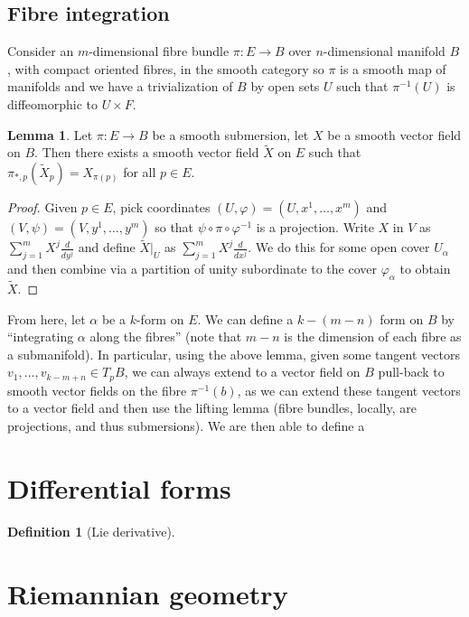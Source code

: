 \documentclass[aps,pra,showpacs,notitlepage,onecolumn,superscriptaddress,nofootinbib]{revtex4-1}
\theoremstyle{definition}
\newtheorem{definition}{Definition}[section]
\newtheorem{lemma}{Lemma}[section]
\begin{document}
\subsection{Fibre integration}

\noindent Consider an $m$-dimensional fibre bundle $\pi : E \rightarrow B$ over $n$-dimensional manifold $B$, with compact oriented fibres,
in the smooth category so $\pi$ is a smooth map of manifolds and we have a trivialization of $B$ by open sets $U$
such that $\pi^{-1}(U)$ is diffeomorphic to $U \times F$.

\begin{lemma}
  Let $\pi : E \rightarrow B$ be a smooth submersion, let $X$ be a smooth vector field on $B$. Then there exists a smooth vector field $\widetilde{X}$ on $E$ such that $\pi_{*, p}(\widetilde{X}_p) = X_{\pi(p)}$
  for all $p \in E$.
  \end{lemma}
\begin{proof}
  Given $p \in E$, pick coordinates $(U, \varphi) = (U, x^1, \dots, x^m)$ and $(V, \psi) = (V, y^1, \dots, y^m)$ so that $\psi \circ \pi \circ \varphi^{-1}$
  is a projection. Write $X$ in $V$ as $\sum_{j = 1}^{m} X^j \frac{d}{dy^j}$ and define $\widetilde{X}|_{U}$ as $\sum_{j = 1}^{m} X^j \frac{d}{d x^j}$. We do this for some open cover $U_{\alpha}$
  and then combine via a partition of unity subordinate to the cover $\varphi_{\alpha}$ to obtain $\widetilde{X}$.
  \end{proof}

\noindent From here, let $\alpha$ be a $k$-form on $E$. We can define a $k - (m - n)$ form on $B$ by ``integrating $\alpha$ along the fibres'' (note that $m - n$ is the dimension of each fibre as a submanifold).
In particular, using the above lemma, given some tangent vectors $v_1, \dots, v_{k - m + n} \in T_p B$, we can always extend to a vector field on $B$ pull-back to smooth vector fields on the fibre $\pi^{-1}(b)$, as we can extend these
tangent vectors to a vector field and then use the lifting lemma (fibre bundles, locally, are projections, and thus submersions). We are then able to define a 

\section{Differential forms}

\begin{definition}[Lie derivative]
  \end{definition}

\section{Riemannian geometry}


\end{document}
